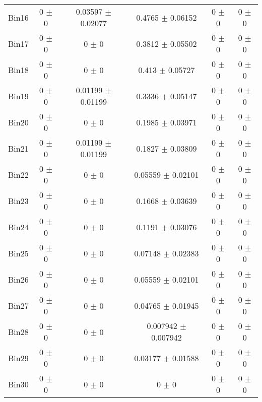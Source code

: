 \begin{tabular}{@{\extracolsep{4pt}}lccccc@{}}
     Bin16 & 0 $\pm$ 0 & 0.03597 $\pm$ 0.02077 & 0.4765 $\pm$ 0.06152 & 0 $\pm$ 0 & 0 $\pm$ 0 \\ 
     Bin17 & 0 $\pm$ 0 & 0 $\pm$ 0 & 0.3812 $\pm$ 0.05502 & 0 $\pm$ 0 & 0 $\pm$ 0 \\ 
     Bin18 & 0 $\pm$ 0 & 0 $\pm$ 0 & 0.413 $\pm$ 0.05727 & 0 $\pm$ 0 & 0 $\pm$ 0 \\ 
     Bin19 & 0 $\pm$ 0 & 0.01199 $\pm$ 0.01199 & 0.3336 $\pm$ 0.05147 & 0 $\pm$ 0 & 0 $\pm$ 0 \\ 
     Bin20 & 0 $\pm$ 0 & 0 $\pm$ 0 & 0.1985 $\pm$ 0.03971 & 0 $\pm$ 0 & 0 $\pm$ 0 \\ 
     Bin21 & 0 $\pm$ 0 & 0.01199 $\pm$ 0.01199 & 0.1827 $\pm$ 0.03809 & 0 $\pm$ 0 & 0 $\pm$ 0 \\ 
     Bin22 & 0 $\pm$ 0 & 0 $\pm$ 0 & 0.05559 $\pm$ 0.02101 & 0 $\pm$ 0 & 0 $\pm$ 0 \\ 
     Bin23 & 0 $\pm$ 0 & 0 $\pm$ 0 & 0.1668 $\pm$ 0.03639 & 0 $\pm$ 0 & 0 $\pm$ 0 \\ 
     Bin24 & 0 $\pm$ 0 & 0 $\pm$ 0 & 0.1191 $\pm$ 0.03076 & 0 $\pm$ 0 & 0 $\pm$ 0 \\ 
     Bin25 & 0 $\pm$ 0 & 0 $\pm$ 0 & 0.07148 $\pm$ 0.02383 & 0 $\pm$ 0 & 0 $\pm$ 0 \\ 
     Bin26 & 0 $\pm$ 0 & 0 $\pm$ 0 & 0.05559 $\pm$ 0.02101 & 0 $\pm$ 0 & 0 $\pm$ 0 \\ 
     Bin27 & 0 $\pm$ 0 & 0 $\pm$ 0 & 0.04765 $\pm$ 0.01945 & 0 $\pm$ 0 & 0 $\pm$ 0 \\ 
     Bin28 & 0 $\pm$ 0 & 0 $\pm$ 0 & 0.007942 $\pm$ 0.007942 & 0 $\pm$ 0 & 0 $\pm$ 0 \\ 
     Bin29 & 0 $\pm$ 0 & 0 $\pm$ 0 & 0.03177 $\pm$ 0.01588 & 0 $\pm$ 0 & 0 $\pm$ 0 \\ 
     Bin30 & 0 $\pm$ 0 & 0 $\pm$ 0 & 0 $\pm$ 0 & 0 $\pm$ 0 & 0 $\pm$ 0 \\ 
\hline\hline
  \end{tabular}
